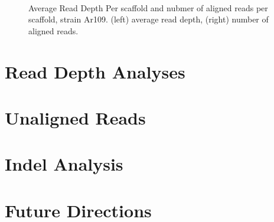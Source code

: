 \documentclass[12pt]{article}
\begin{document}
\begin{figure}[H]
	\begin{centering}

		\\
		\begin{singlespace}
			\vspace{-0.5cm}
			\caption[Average Read Depth Per scaffold, strain Ar109.]{Average Read Depth Per scaffold and nubmer of aligned reads per scaffold, strain Ar109. (left) average read depth, (right) number of aligned reads.}\label{109avgcountgraph}
		\end{singlespace}
	\end{centering}
\end{figure}

%
%
	\section{Read Depth Analyses}
	\newpage

%
%
	\section{Unaligned Reads}
	\newpage

%
%
	\section{Indel Analysis}
	\newpage

%
%
	\section{Future Directions}
	\newpage
	
	
	
\end{document}
